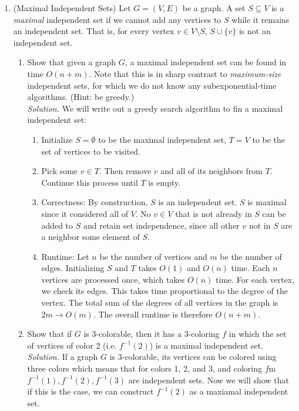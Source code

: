 \documentclass[11pt]{article}
\begin{document}
\begin{enumerate}
 \item (Maximal Independent Sets) Let $G=(V,E)$ be a graph.  A set $S\subseteq V$ is a {\em maximal} independent set if we cannot add any vertices to $S$ while it remains an independent set.  That is, for every vertex $v\in V\setminus S$, $S\cup\{v\}$ is not an independent set.
    \begin{enumerate}
        \item Show that given a graph $G$, a maximal independent set can be found in time $O(n+m)$.  Note that this is in sharp contrast to {\em maximum-size} independent sets, for which we do not know any subexponential-time algorithms. (Hint: be greedy.) \\
        
        \textit{Solution. }
        We will write out a greedy search algorithm to fin a maximal independent set:
        \begin{enumerate}
          \item Initialize $S = \emptyset$ to be the maximal independent set, $T = V$ to be the set of vertices to be visited.
          \item Pick some $v \in T$. Then remove $v$ and all of its neighbors from $T$. Continue this process until $T$ is empty.
          \item Correctness: By construction, $S$ is an independent set. $S$ is maximal since it considered all of $V$. No $v \in V$ that is not already in $S$ can be added to $S$ and retain set independence, since all other $v$ not in $S$ are a neighbor some element of $S$.
          \item Runtime: Let $n$ be the number of vertices and $m$ be the number of edges. Initializing $S$ and $T$ takes $O(1)$ and $O(n)$ time. Each $n$ vertices are processed once, which takes $O(n)$ time. For each vertex, we check its edges. This takes time proportional to the degree of the vertex. The total sum of the degrees of all vertices in the graph is $2 m \rightarrow O(m)$. The overall runtime is therefore $O(n+m)$.
        \end{enumerate}
        
        \item Show that if $G$ is 3-colorable, then it has a 3-coloring $f$ in which the set of vertices of color 2 (i.e. $f^{-1}(2)$) is a maximal independent set. \\

        \textit{Solution. } If a graph $G$ is 3-colorable, its vertices can be colored using three colors which means that for colors 1, 2, and 3, and coloring $f$m $f^{-1}(1), f^{-1}(2), f^{-1}(3)$ are independent sets. Now we will show that if this is the case, we can construct $f^{-1}(2)$ as a maxiamal independent set.


\end{enumerate}
\end{enumerate}
\end{document}
